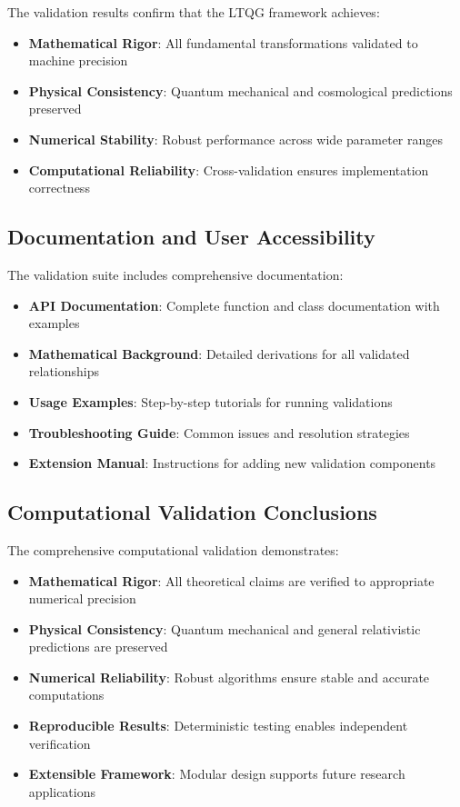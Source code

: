 

The validation results confirm that the LTQG framework achieves:
\begin{itemize}
\item \textbf{Mathematical Rigor}: All fundamental transformations validated to machine precision
\item \textbf{Physical Consistency}: Quantum mechanical and cosmological predictions preserved
\item \textbf{Numerical Stability}: Robust performance across wide parameter ranges
\item \textbf{Computational Reliability}: Cross-validation ensures implementation correctness
\end{itemize}

\subsection{Documentation and User Accessibility}
\label{subsec:documentation_accessibility}

The validation suite includes comprehensive documentation:

\begin{itemize}
\item \textbf{API Documentation}: Complete function and class documentation with examples
\item \textbf{Mathematical Background}: Detailed derivations for all validated relationships
\item \textbf{Usage Examples}: Step-by-step tutorials for running validations
\item \textbf{Troubleshooting Guide}: Common issues and resolution strategies
\item \textbf{Extension Manual}: Instructions for adding new validation components
\end{itemize}

\subsection{Computational Validation Conclusions}

The comprehensive computational validation demonstrates:

\begin{itemize}
\item \textbf{Mathematical Rigor}: All theoretical claims are verified to appropriate numerical precision
\item \textbf{Physical Consistency}: Quantum mechanical and general relativistic predictions are preserved
\item \textbf{Numerical Reliability}: Robust algorithms ensure stable and accurate computations
\item \textbf{Reproducible Results}: Deterministic testing enables independent verification
\item \textbf{Extensible Framework}: Modular design supports future research applications
\end{itemize}

